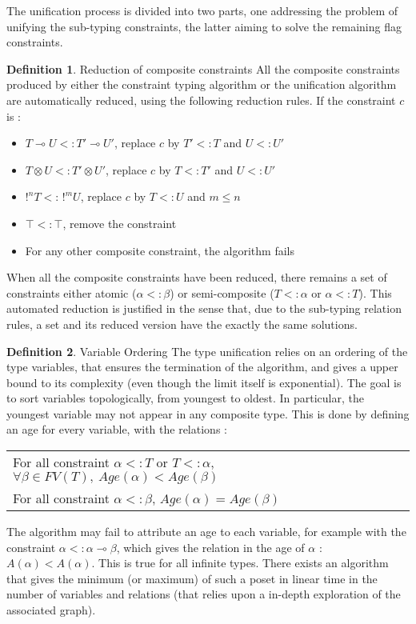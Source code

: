 \documentclass[10pt]{article}
\theoremstyle{plain}
\theoremstyle{definition}
\newtheorem{defn}{Definition}[subsection] %
\begin{document}
The unification process is divided into two parts, one addressing the problem of unifying the sub-typing constraints,
the latter aiming to solve the remaining flag constraints.

\begin{defn}{Reduction of composite constraints}
	All the composite constraints produced by either the constraint typing
  algorithm or the unification algorithm are automatically reduced, using the following reduction rules.
  If the constraint $c$ is :
  	\begin{itemize}
      \item $T \multimap U <: T' \multimap U'$, replace $c$ by $T' <: T$ and $U <: U'$
      \item $T \otimes U <: T' \otimes U'$, replace $c$ by $T <: T'$ and $U <: U'$
      \item $!^n T <: \, !^m U$, replace $c$ by $T <: U$ and $m \le n$
      \item $\top <: \top$, remove the constraint
      \item For any other composite constraint, the algorithm fails
    \end{itemize}
  When all the composite constraints have been reduced, there remains a set of constraints either atomic ($\alpha <: \beta$) or
  semi-composite ($T <: \alpha$ or $\alpha <: T$).
  This automated reduction is justified in the sense that, due to the sub-typing relation rules, a set and its reduced version
  have the exactly the same solutions.
\end{defn}

\begin{defn}{Variable Ordering}
	The type unification relies on an ordering of the type variables, that ensures the termination of the algorithm, and gives a upper
	bound to its complexity (even though the limit itself is exponential).
	The goal is to sort variables topologically, from youngest to oldest. In particular,
  the youngest variable may not appear in any composite type. This is done by defining an age for every variable, with the
  relations :
  	\begin{center}
  	\begin{tabular}{l}
  	  For all constraint $\alpha <: T$ or $T <: \alpha$, $\forall \beta \in FV(T), ~ Age (\alpha) < Age (\beta)$ \\
  	  For all constraint $\alpha <: \beta$, $Age (\alpha) = Age (\beta)$
  	\end{tabular}
  	\end{center}
  	The algorithm may fail to attribute an age to each variable, for example with the constraint $\alpha <: \alpha \multimap \beta$, which gives the
  	relation in the age of $\alpha$ : $A(\alpha) < A(\alpha)$. This is true for all infinite types.
  	There exists an algorithm that gives the minimum (or maximum) of such a poset in linear time in the number of variables and relations
  	(that relies upon a in-depth exploration of the associated graph).
\end{defn}
\end{document}
